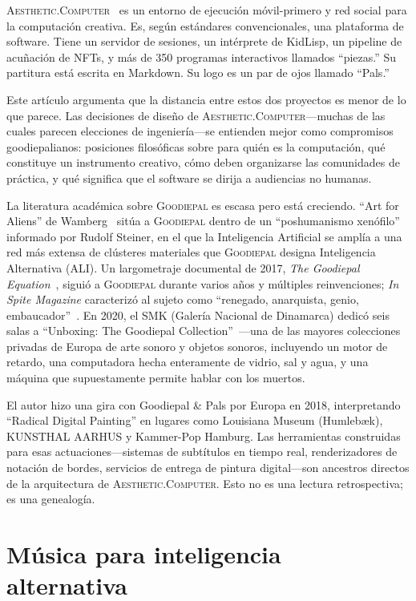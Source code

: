 \documentclass[10pt,letterpaper,twocolumn]{article}
\newcommand{\ac}{\textsc{Aesthetic.Computer}}
\newcommand{\gp}{\textsc{Goodiepal}}
\begin{document}
\ac{}~\citep{scudder2026ac} es un entorno de ejecución móvil-primero y red social para la computación creativa. Es, según estándares convencionales, una plataforma de software. Tiene un servidor de sesiones, un intérprete de KidLisp, un pipeline de acuñación de NFTs, y más de 350 programas interactivos llamados ``piezas.'' Su partitura está escrita en Markdown. Su logo es un par de ojos llamado ``Pals.''

Este artículo argumenta que la distancia entre estos dos proyectos es menor de lo que parece. Las decisiones de diseño de \ac{}---muchas de las cuales parecen elecciones de ingeniería---se entienden mejor como compromisos goodiepalianos: posiciones filosóficas sobre para quién es la computación, qué constituye un instrumento creativo, cómo deben organizarse las comunidades de práctica, y qué significa que el software se dirija a audiencias no humanas.

La literatura académica sobre \gp{} es escasa pero está creciendo. ``Art for Aliens'' de Wamberg~\citep{wamberg2022artforaliens} sitúa a \gp{} dentro de un ``poshumanismo xenófilo'' informado por Rudolf Steiner, en el que la Inteligencia Artificial se amplía a una red más extensa de clústeres materiales que \gp{} designa Inteligencia Alternativa (ALI). Un largometraje documental de 2017, \emph{The Goodiepal Equation}~\citep{sanpakkila2017equation}, siguió a \gp{} durante varios años y múltiples reinvenciones; \emph{In Spite Magazine} caracterizó al sujeto como ``renegado, anarquista, genio, embaucador''~\citep{inspite2024goodiepal}. En 2020, el SMK (Galería Nacional de Dinamarca) dedicó seis salas a ``Unboxing: The Goodiepal Collection''~\citep{smk2020unboxing}---una de las mayores colecciones privadas de Europa de arte sonoro y objetos sonoros, incluyendo un motor de retardo, una computadora hecha enteramente de vidrio, sal y agua, y una máquina que supuestamente permite hablar con los muertos.

El autor hizo una gira con Goodiepal \& Pals por Europa en 2018, interpretando ``Radical Digital Painting'' en lugares como Louisiana Museum (Humleb\ae k), KUNSTHAL AARHUS y Kammer-Pop Hamburg. Las herramientas construidas para esas actuaciones---sistemas de subtítulos en tiempo real, renderizadores de notación de bordes, servicios de entrega de pintura digital---son ancestros directos de la arquitectura de \ac{}. Esto no es una lectura retrospectiva; es una genealogía.

\section{Música para inteligencia alternativa}
\end{document}
